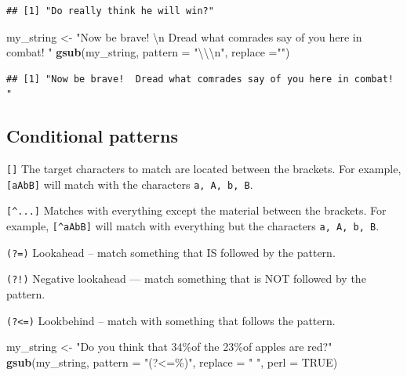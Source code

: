 \documentclass[
]{book}
\newenvironment{Shaded}{\begin{snugshade}}{\end{snugshade}}
\newcommand{\CharTok}[1]{\textcolor[rgb]{0.31,0.60,0.02}{#1}}
\newcommand{\DataTypeTok}[1]{\textcolor[rgb]{0.13,0.29,0.53}{#1}}
\newcommand{\KeywordTok}[1]{\textcolor[rgb]{0.13,0.29,0.53}{\textbf{#1}}}
\newcommand{\NormalTok}[1]{#1}
\newcommand{\OtherTok}[1]{\textcolor[rgb]{0.56,0.35,0.01}{#1}}
\newcommand{\StringTok}[1]{\textcolor[rgb]{0.31,0.60,0.02}{#1}}
\theoremstyle{definition}
\theoremstyle{definition}
\theoremstyle{definition}
\theoremstyle{remark}
\begin{document}
\begin{verbatim}
## [1] "Do really think he will win?"
\end{verbatim}

\begin{Shaded}
\begin{Highlighting}[]
\NormalTok{my\_string <{-}}\StringTok{ "Now be brave! }\CharTok{\textbackslash{}n}\StringTok{ Dread what comrades say of you here in combat! "}
\KeywordTok{gsub}\NormalTok{(my\_string, }\DataTypeTok{pattern =} \StringTok{"}\CharTok{\textbackslash{}\textbackslash{}\textbackslash{}n}\StringTok{"}\NormalTok{, }\DataTypeTok{replace =}\StringTok{""}\NormalTok{) }
\end{Highlighting}
\end{Shaded}

\begin{verbatim}
## [1] "Now be brave!  Dread what comrades say of you here in combat! "
\end{verbatim}

\hypertarget{conditional-patterns}{%
\subsection{Conditional patterns}\label{conditional-patterns}}

\texttt{{[}{]}} The target characters to match are located between the brackets. For example, \texttt{{[}aAbB{]}} will match with the characters \texttt{a,\ A,\ b,\ B}.

\texttt{{[}\^{}...{]}} Matches with everything except the material between the brackets. For example, \texttt{{[}\^{}aAbB{]}} will match with everything but the characters \texttt{a,\ A,\ b,\ B}.

\texttt{(?=)} Lookahead -- match something that IS followed by the pattern.

\texttt{(?!)} Negative lookahead --- match something that is NOT followed by the pattern.

\texttt{(?\textless{}=)} Lookbehind -- match with something that follows the pattern.

\begin{Shaded}
\begin{Highlighting}[]
\NormalTok{my\_string <{-}}\StringTok{ "Do you think that 34\%of the 23\%of apples are red?"}
\KeywordTok{gsub}\NormalTok{(my\_string, }\DataTypeTok{pattern =} \StringTok{"(?<=\%)"}\NormalTok{, }\DataTypeTok{replace =} \StringTok{" "}\NormalTok{, }\DataTypeTok{perl =} \OtherTok{TRUE}\NormalTok{)}
\end{Highlighting}
\end{Shaded}
\end{document}
